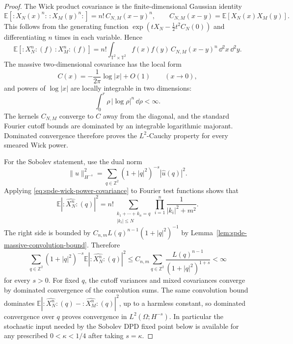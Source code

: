 \begin{proof}
The Wick product covariance is the finite-dimensional Gaussian identity
\begin{equation}
  \mathbb E\!\left[
    :\!X_N(x)^n\!:\,:\!X_M(y)^n\!:
  \right]
  =
  n!\,C_{N,M}(x-y)^n,
  \qquad
  C_{N,M}(x-y)=\mathbb E[X_N(x)X_M(y)] .
  \label{eq:spde-wick-power-covariance}
\end{equation}
This follows from the generating function
\(\exp(tX_N-\frac12t^2C_N(0))\) and differentiating \(n\) times in each
variable.  Hence
\[
  \mathbb E\left[
    :\!X_N^n\!:(f)\,:\!X_M^n\!:(f)
  \right]
  =
  n!\int_{\mathbb T^2\times\mathbb T^2}
  f(x)f(y)\,C_{N,M}(x-y)^n\,\dd^2x\,\dd^2y .
\]
The massive two-dimensional covariance has the local form
\[
  C(x)=-\frac{1}{2\pi}\log |x|+O(1)
  \qquad (x\to0),
\]
and powers of \(\log |x|\) are locally integrable in two dimensions:
\[
  \int_0^r \rho\,|\log \rho|^n\,\dd\rho<\infty .
\]
The kernels \(C_{N,M}\) converge to \(C\) away from the diagonal, and the
standard Fourier cutoff bounds are dominated by an integrable logarithmic
majorant.  Dominated convergence therefore proves the \(L^2\)-Cauchy
property for every smeared Wick power.

For the Sobolev statement, use the dual norm
\[
  \|u\|_{H^{-s}}^2
  =
  \sum_{q\in\mathbb Z^2}
  (1+|q|^2)^{-s}|\widehat u(q)|^2 .
\]
Applying \eqref{eq:spde-wick-power-covariance} to Fourier test functions
shows that
\begin{equation}
  \mathbb E|\widehat{:\!X_N^n\!:}(q)|^2
  =
  n!\!
  \sum_{\substack{k_1+\cdots+k_n=q\\ |k_i|\leq N}}
  \prod_{i=1}^n\frac{1}{|k_i|^2+m^2}.
  \label{eq:spde-wick-fourier-variance-convolution}
\end{equation}
The right side is bounded by
\(C_{n,m}L(q)^{n-1}(1+|q|^2)^{-1}\) by
Lemma~\ref{lem:spde-massive-convolution-bound}.  Therefore
\[
  \sum_{q\in\mathbb Z^2}
  (1+|q|^2)^{-s}
  \mathbb E|\widehat{:\!X_N^n\!:}(q)|^2
  \leq
  C_{n,m}
  \sum_{q\in\mathbb Z^2}
  \frac{L(q)^{n-1}}{(1+|q|^2)^{1+s}}<\infty
\]
for every \(s>0\).  For fixed \(q\), the cutoff variances and mixed
covariances converge by dominated convergence of the convolution sums.
The same convolution bound dominates
\(\mathbb E|\widehat{:\!X_N^n\!:}(q)
          -\widehat{:\!X_M^n\!:}(q)|^2\), up to a harmless constant, so
dominated convergence over \(q\) proves convergence in
\(L^2(\Omega;H^{-s})\).  In particular the stochastic input needed by the
Sobolev DPD fixed point below is available for any prescribed
\(0<\kappa<1/4\) after taking \(s=\kappa\).
\end{proof}


